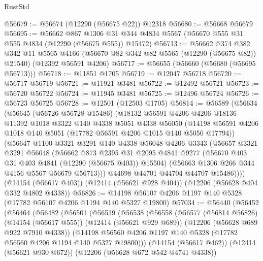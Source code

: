 \begin{lexlean}{RustStd}
\begin{coremodule}
@56679 := @56674 (@12290 (@56675 @22)) @12318
@56680 := @56668 @56679
@56695 := @56662
    @867
    @1306
    @31
    @344
    @4834
    @5567
    (@56670 @555 @31 @555 @4834 (@12290 (@56675 @555)) @15472)
@56713 := @56662
    @374
    @382
    @342
    @11
    @5565
    @4166
    (@56670 @82 @342 @82 @5565 (@12290 (@56675 @82)) @21540)
    (@12392 @56591 @4206)
@56717 := @56655 (@56660 (@56680 (@56695 @56713)))
@56718 := @11851 @1705
@56719 := @12047 @56718
@56720 := @56717 @56719
@56721 := @11921 @3481
@56722 := @12492 @56721
@56723 := @56720 @56722
@56724 := @11945 @3481
@56725 := @12496 @56724
@56726 := @56723 @56725
@56728 := @12501 (@12503 @1705)
@56814 := @56589
    (@56634
      (@56645
        (@56726 @56728 @15486)
        (@18132
          @56591
          @4206
          @4206
          @18136
          @11392
          @1018
          @3322
          @140
          @4338
          @5051
          @4338
          @56050
          (@14198 @56591 @4206 @1018 @140 @5051 (@17782 @56591 @4206 @1015 @140 @5050 @17794))
          (@56647
            @1100
            @3321
            @3291
            @140
            @4338
            @56048
            @4206
            @3343
            (@56657
              @3321
              @3291
              @56048
              (@56662
                @873
                @2395
                @31
                @2095
                @4841
                @9277
                (@56670 @403 @31 @403 @4841 (@12290 (@56675 @403)) @15504)
                (@56663 @1306 @266 @344 @4156 @5567 @56679 @56713)))
            @44698
            @44701
            @44704
            @44707
            @15486))))
    (@14154 (@56617 @403))
    (@12414 (@56621 @928 @404))
    (@12206 (@56628 @404 @332 @4802 @4338))
@56826 := @14198 @56107 @4206 @1197 @140 @5328 (@17782 @56107 @4206 @1194 @140 @5327 @19800)
@57034 := @56440
    (@56452
      (@56464
        (@56482
          (@56501
            (@56519
              (@56538
                (@56558
                  (@56577
                    (@56814 @56826)
                    (@14154 (@56617 @555))
                    (@12414 (@56621 @929 @689))
                    (@12206 (@56628 @689 @922 @7910 @4338))
                    (@14198
                      @56560
                      @4206
                      @1197
                      @140
                      @5328
                      (@17782 @56560 @4206 @1194 @140 @5327 @19800)))
                  (@14154 (@56617 @462))
                  (@12414 (@56621 @930 @672))
                  (@12206 (@56628 @672 @542 @4741 @4338))

\end{coremodule}
\end{lexlean}
